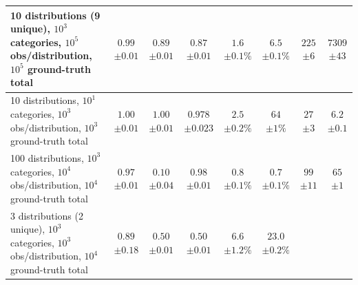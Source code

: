 \documentclass{article}
\theoremstyle{plain}
\theoremstyle{definition}
\theoremstyle{remark}
\begin{document}
\begin{table}[h]
\begin{center}
\begin{scriptsize}
\begin{sc}
\begin{tabular}{l||c|c|c||c|c||c|c}
\makecell{10 distributions (9 unique), $10^3$ categories,\\$10^5$ obs/distribution, $10^5$ ground-truth total} & 
\makecell{$0.99$\\$\pm 0.01$} & \makecell{$0.89$\\$\pm 0.01$} & \makecell{$0.87$\\$\pm 0.01$} & 
\makecell{$1.6$\\$\pm 0.1\%$} & \makecell{$6.5$\\$\pm 0.1\%$} & 
\makecell{$225$\\$\pm 6$} & \makecell{$7309$\\$\pm 43$} \\
\hline
\makecell{10 distributions, $10^1$ categories,\\$10^3$ obs/distribution, $10^3$ ground-truth total} & 
\makecell{$1.00$\\$\pm 0.01$} & \makecell{$1.00$\\$\pm 0.01$} & \makecell{$0.978$\\$\pm 0.023$} & 
\makecell{$2.5$\\$\pm 0.2\%$} & \makecell{$64$\\$\pm 1\%$} & 
\makecell{$27$\\$\pm 3$} & \makecell{$6.2$\\$\pm 0.1$} \\
\hline
\makecell{100 distributions, $10^3$ categories,\\$10^4$ obs/distribution, $10^4$ ground-truth total} & 
\makecell{$0.97$\\$\pm 0.01$} & \makecell{$0.10$\\$\pm 0.04$} & \makecell{$0.98$\\$\pm 0.01$} & 
\makecell{$0.8$\\$\pm 0.1\%$} & \makecell{$0.7$\\$\pm 0.1\%$} & 
\makecell{$99$\\$\pm 11$} & \makecell{$65$\\$\pm 1$} \\
\hline
\makecell{3 distributions (2 unique), $10^3$ categories,\\$10^3$ obs/distribution, $10^4$ ground-truth total} & 
\makecell{$0.89$\\$\pm 0.18$} & \makecell{$0.50$\\$\pm 0.01$} & \makecell{$0.50$\\$\pm 0.01$} & 
\makecell{$6.6$\\$\pm 1.2\%$} & \makecell{$23.0$\\$\pm 0.2\%$} & 

\end{tabular}
\end{sc}
\end{scriptsize}
\end{center}
\end{table}
\end{document}
